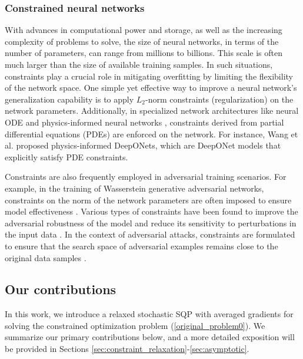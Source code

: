 \documentclass[aos]{imsart}
\numberwithin{equation}{section}
\theoremstyle{plain}
\begin{document}
\subsubsection{Constrained neural networks}

With advances in computational power and storage, as well as the increasing complexity of problems to solve, the size of neural networks, in terms of the number of parameters, can range from millions to billions. This scale is often much larger than the size of available training samples. In such situations, constraints play a crucial role in mitigating overfitting by limiting the flexibility of the network space.
One simple yet effective way to improve a neural network's generalization capability is to apply $L_2$-norm constraints (regularization) on the network parameters. Additionally, in specialized network architectures like neural ODE \cite{chen2018neural} and physics-informed neural networks \cite{raissi2019physics, karniadakis2021physics}, constraints derived from partial differential equations (PDEs) are enforced on the network. For instance, Wang et al. \cite{wang2021learning} proposed physics-informed DeepONets, which are DeepONet models that explicitly satisfy PDE constraints. 


Constraints are also frequently employed in adversarial training scenarios. For example, in the training of Wasserstein generative adversarial networks, constraints on the norm of the network parameters are often imposed to ensure model effectiveness \cite{arjovsky2017wasserstein}. Various types of constraints have been found to improve the adversarial robustness of the model and reduce its sensitivity to perturbations in the input data \cite{cisse2017parseval}. In the context of adversarial attacks, constraints are formulated to ensure that the search space of adversarial examples remains close to the original data samples \cite{goodfellow2014explaining, su2019one, zhu2023adversarial}.




\subsection{Our contributions}
In this work, we introduce a relaxed stochastic SQP with averaged gradients for solving the constrained optimization problem (\ref{original_problem0}). We summarize our primary contributions below, and a more detailed exposition will be provided in Sections \ref{sec:constraint_relaxation}-\ref{sec:asymptotic}.
\end{document}
